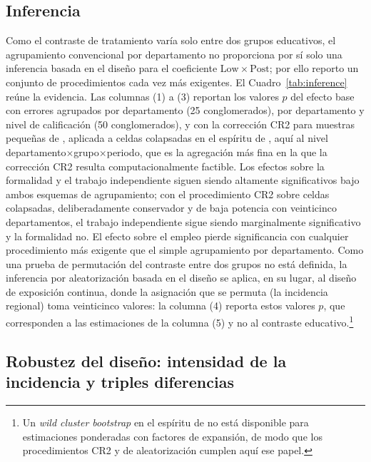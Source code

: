\subsection{Inferencia}

Como el contraste de tratamiento varía solo entre dos grupos educativos, el agrupamiento convencional por departamento no proporciona por sí solo una inferencia basada en el diseño para el coeficiente $\mathrm{Low}\times\mathrm{Post}$; por ello reporto un conjunto de procedimientos cada vez más exigentes. El Cuadro~\ref{tab:inference} reúne la evidencia. Las columnas (1) a (3) reportan los valores $p$ del efecto base con errores agrupados por departamento (25 conglomerados), por departamento y nivel de calificación (50 conglomerados), y con la corrección CR2 para muestras pequeñas de \citet{pustejovsky_tipton_2018}, aplicada a celdas colapsadas en el espíritu de \citet{bertrand_2004}, aquí al nivel departamento$\times$grupo$\times$periodo, que es la agregación más fina en la que la corrección CR2 resulta computacionalmente factible. Los efectos sobre la formalidad y el trabajo independiente siguen siendo altamente significativos bajo ambos esquemas de agrupamiento; con el procedimiento CR2 sobre celdas colapsadas, deliberadamente conservador y de baja potencia con veinticinco departamentos, el trabajo independiente sigue siendo marginalmente significativo y la formalidad no. El efecto sobre el empleo pierde significancia con cualquier procedimiento más exigente que el simple agrupamiento por departamento. Como una prueba de permutación del contraste entre dos grupos no está definida, la inferencia por aleatorización basada en el diseño se aplica, en su lugar, al diseño de exposición continua, donde la asignación que se permuta (la incidencia regional) toma veinticinco valores: la columna (4) reporta estos valores $p$, que corresponden a las estimaciones de la columna (5) y no al contraste educativo.\footnote{Un \emph{wild cluster bootstrap} en el espíritu de \citet{cameron_2008_bootstrap} no está disponible para estimaciones ponderadas con factores de expansión, de modo que los procedimientos CR2 y de aleatorización cumplen aquí ese papel.}



\subsection{Robustez del diseño: intensidad de la incidencia y triples diferencias}

